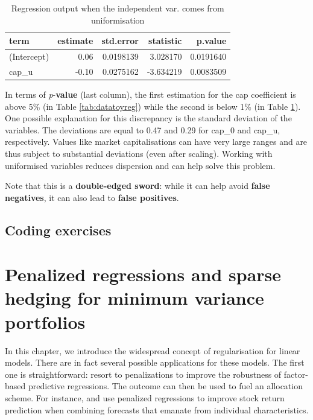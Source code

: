 \documentclass[]{krantz}
\theoremstyle{definition}
\theoremstyle{definition}
\theoremstyle{definition}
\theoremstyle{remark}
\begin{document}
\begin{table}[t]

\caption{\label{tab:datatoyreg2}Regression output when the independent var. comes from uniformisation}
\centering
\begin{tabular}{l|r|r|r|r}
\hline
term & estimate & std.error & statistic & p.value\\
\hline
(Intercept) & 0.06 & 0.0198139 & 3.028170 & 0.0191640\\
\hline
cap\_u & -0.10 & 0.0275162 & -3.634219 & 0.0083509\\
\hline
\end{tabular}
\end{table}

\normalsize In terms of \emph{p}-\textbf{value} (last column), the first
estimation for the cap coefficient is above 5\% (in Table
\ref{tab:datatoyreg}) while the second is below 1\% (in Table
\ref{tab:datatoyreg2}). One possible explanation for this discrepancy is
the standard deviation of the variables. The deviations are equal to
0.47 and 0.29 for cap\_0 and cap\_u, respectively. Values like market
capitalisations can have very large ranges and are thus subject to
substantial deviations (even after scaling). Working with uniformised
variables reduces dispersion and can help solve this problem.

Note that this is a \textbf{double-edged sword}: while it can help avoid
\textbf{false negatives}, it can also lead to \textbf{false positives}.

\hypertarget{coding-exercises-1}{%
\section{Coding exercises}\label{coding-exercises-1}}

\hypertarget{lasso}{%
\chapter{Penalized regressions and sparse hedging for minimum variance
portfolios}\label{lasso}}

In this chapter, we introduce the widespread concept of regularisation
for linear models. There are in fact several possible applications for
these models. The first one is straightforward: resort to penalizations
to improve the robustness of factor-based predictive regressions. The
outcome can then be used to fuel an allocation scheme. For instance,
\citet{han2018firm} and \citet{rapach2019time} use penalized regressions
to improve stock return prediction when combining forecasts that emanate
from individual characteristics.
\end{document}
